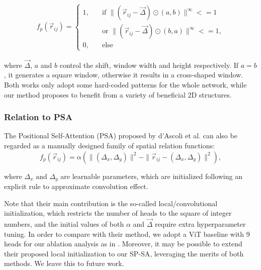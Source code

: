\documentclass[authorversion, sigconf, acmthm=false, nonacm=true]{acmart}
\begin{document}
\begin{align}
           f_p(\vec{r}_{ij}) = 
    \begin{cases}
            1, \quad & \text{if } \| (\vec{r}_{ij} - \vec{\Delta}) \odot (a, b)  \|^{\infty} <= 1 \\
            \quad &\text{or } \| (\vec{r}_{ij} - \vec{\Delta}) \odot (b, a)\|^{\infty} <= 1 , \\
            0, \quad & \text{else }
    \end{cases}
\label{window}
\end{align}

\noindent where $\vec{\Delta}$, $a$ and $b$ control the shift, window width and height respectively. If $a=b$, it generates a square window, otherwise it results in a cross-shaped window.
Both works only adopt some hard-coded patterns for the whole network, while our method proposes to benefit from a variety of 
beneficial 2D structures.






 










\subsubsection{Relation to PSA}


The Positional Self-Attention (PSA) proposed by  d’Ascoli et al. \cite{d'ascoli2021convit} can also be regarded as a manually designed family of spatial relation functions:
\begin{equation}
    f_p(\vec{r}_{ij}) = \alpha (\|(\Delta_x, \Delta_y)\|^2-\| \vec{r}_{ij} - (\Delta_x, \Delta_y)\|^2),
\label{local.init}
\end{equation}


\noindent where $\Delta_x \text{ and } \Delta_y$ are learnable parameters, 
which are initialized following an explicit rule to approximate convolution effect.

Note that their main contribution is the so-called local/convolutional initialization, 
which restricts the number of heads to the square of integer numbers, and the initial values of both $\alpha$ and $\vec{\Delta}$ require extra hyperparameter tuning. 
In order to compare with their method, we adopt a ViT baseline with 9 heads for our ablation analysis as in \cite{d'ascoli2021convit}.
Moreover, it may be possible to extend their proposed local initialization to our SP-SA, 
leveraging the merits of both methods. We leave this to future work.
\end{document}
